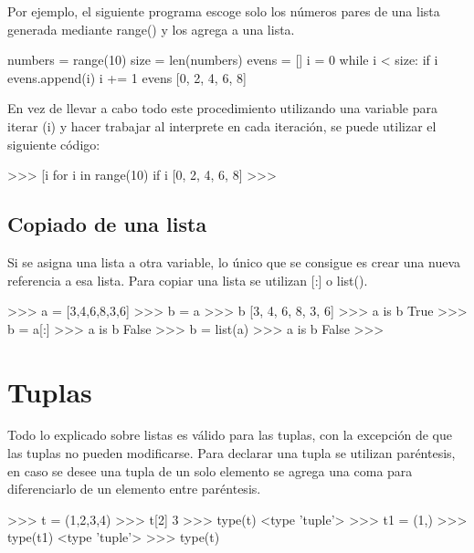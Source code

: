 Por ejemplo, el siguiente programa escoge solo los números pares de una lista generada mediante range() y los agrega a una lista.\cite{Ziade2008} \\

\begin{pyglist} [language=python]
numbers = range(10)
size = len(numbers)
evens = []
i = 0
while i < size:
    if i %
       evens.append(i)
    i += 1
evens
[0, 2, 4, 6, 8]
\end{pyglist}

En vez de llevar a cabo todo este procedimiento utilizando una variable para iterar (i) y hacer trabajar al interprete en cada iteración, se puede utilizar el siguiente código:

\begin{pyglist} [language=python]
>>> [i for i in range(10) if i %
[0, 2, 4, 6, 8]
>>>
\end{pyglist}

\subsection{Copiado de una lista}

Si se asigna una lista a otra variable, lo único que se consigue es crear una nueva referencia a esa lista. Para copiar una lista se utilizan [:] o list().\\

\begin{pyglist} [language=python]
>>> a = [3,4,6,8,3,6]
>>> b = a
>>> b
[3, 4, 6, 8, 3, 6]
>>> a is b
True
>>> b = a[:]
>>> a is b
False
>>> b = list(a)
>>> a is b
False
>>> 
\end{pyglist}

\section{Tuplas}

Todo lo explicado sobre listas es válido para las tuplas, con la excepción de que las tuplas no pueden modificarse. Para declarar una tupla se utilizan paréntesis, en caso se desee una tupla de un solo elemento se agrega una coma para diferenciarlo de un elemento entre paréntesis.

\begin{pyglist} [language=python]
>>> t = (1,2,3,4)
>>> t[2]
3
>>>  type(t)
<type 'tuple'>
>>> t1 = (1,)
>>> type(t1)
<type 'tuple'>
>>> type(t)
\end{pyglist}

